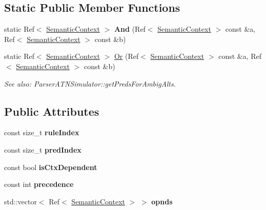 \subsection*{Static Public Member Functions}
\begin{DoxyCompactItemize}
\item 
\mbox{\label{classantlr4_1_1atn_1_1SemanticContext_ae5fa5f9f1afcb130e72a863261dfdf17}} 
static Ref$<$ \hyperlink{classantlr4_1_1atn_1_1SemanticContext}{Semantic\+Context} $>$ {\bfseries And} (Ref$<$ \hyperlink{classantlr4_1_1atn_1_1SemanticContext}{Semantic\+Context} $>$ const \&a, Ref$<$ \hyperlink{classantlr4_1_1atn_1_1SemanticContext}{Semantic\+Context} $>$ const \&b)
\item 
\mbox{\label{classantlr4_1_1atn_1_1SemanticContext_ac3f8e16f8e36c133d7f00c12f4dbb713}} 
static Ref$<$ \hyperlink{classantlr4_1_1atn_1_1SemanticContext}{Semantic\+Context} $>$ \hyperlink{classantlr4_1_1atn_1_1SemanticContext_ac3f8e16f8e36c133d7f00c12f4dbb713}{Or} (Ref$<$ \hyperlink{classantlr4_1_1atn_1_1SemanticContext}{Semantic\+Context} $>$ const \&a, Ref$<$ \hyperlink{classantlr4_1_1atn_1_1SemanticContext}{Semantic\+Context} $>$ const \&b)
\begin{DoxyCompactList}\small\item\em See also\+: Parser\+A\+T\+N\+Simulator\+::get\+Preds\+For\+Ambig\+Alts. \end{DoxyCompactList}\end{DoxyCompactItemize}
\subsection*{Public Attributes}
\begin{DoxyCompactItemize}
\item 
\mbox{\label{classantlr4_1_1atn_1_1SemanticContext_aaa69247b8b3438faa30bdf602e069d9c}} 
const size\+\_\+t {\bfseries rule\+Index}
\item 
\mbox{\label{classantlr4_1_1atn_1_1SemanticContext_a2652c6e126c20b53d778bb47ecfd10f0}} 
const size\+\_\+t {\bfseries pred\+Index}
\item 
\mbox{\label{classantlr4_1_1atn_1_1SemanticContext_aa1b978bf67f2afd84ade39551069caac}} 
const bool {\bfseries is\+Ctx\+Dependent}
\item 
\mbox{\label{classantlr4_1_1atn_1_1SemanticContext_a282c15dd847543c2b65f902afdf6dde4}} 
const int {\bfseries precedence}
\item 
\mbox{\label{classantlr4_1_1atn_1_1SemanticContext_ad10b5a57a36aa9b51eb943fe20b9a178}} 
std\+::vector$<$ Ref$<$ \hyperlink{classantlr4_1_1atn_1_1SemanticContext}{Semantic\+Context} $>$ $>$ {\bfseries opnds}
\end{DoxyCompactItemize}
